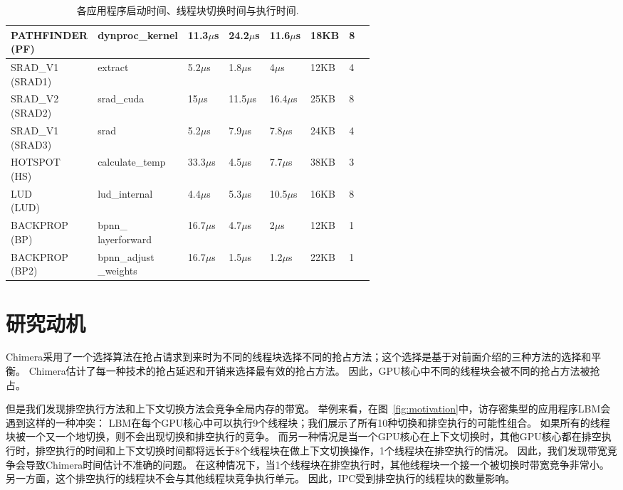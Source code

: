 \begin{scriptsize}
\begin{table}[t]
\begin{tabular}{|l|l|l|l|l|l|l|l|}
    \hline
    \tabincell{c}{PATHFINDER\\(PF)}  & dynproc\_kernel&11.3$\mu$s &24.2$\mu$s&11.6$\mu$s&18KB&8\\
    \hline
    \tabincell{c}{SRAD\_V1\\(SRAD1)} & extract&5.2$\mu$s &1.8$\mu$s&4$\mu$s&12KB&4\\
   	\hline
    \tabincell{c}{SRAD\_V2\\(SRAD2)}  & srad\_cuda& 15$\mu$s & 11.5$\mu$s&16.4$\mu$s&25KB&8\\
    \hline
    \tabincell{c}{SRAD\_V1\\(SRAD3)} & srad & 5.2$\mu$s &7.9$\mu$s &7.8$\mu$s&24KB&4\\
    \hline
    \tabincell{c}{HOTSPOT\\(HS)} & calculate\_temp &33.3$\mu$s&4.5$\mu$s&7.7$\mu$s&38KB&3\\
    \hline
    \tabincell{c}{LUD\\(LUD)} & lud\_internal & 4.4$\mu$s &5.3$\mu$s&10.5$\mu$s&16KB&8\\
    \hline
    \tabincell{c}{BACKPROP\\(BP)} & \tabincell{c}{bpnn\_ \\ layerforward} & 16.7$\mu$s &4.7$\mu$s &2$\mu$s&12KB&1\\
    \hline
    \tabincell{c}{BACKPROP\\(BP2)} & \tabincell{c}{bpnn\_adjust \\ \_weights} & 16.7$\mu$s & 1.5$\mu$s &1.2$\mu$s&22KB&1\\
    \hline
    
  \end{tabular}
  \caption{各应用程序启动时间、线程块切换时间与执行时间.}
  \label{table:time}
\end{table}
\end{scriptsize}

\section{研究动机}
Chimera采用了一个选择算法在抢占请求到来时为不同的线程块选择不同的抢占方法；这个选择是基于对前面介绍的三种方法的选择和平衡。
Chimera估计了每一种技术的抢占延迟和开销来选择最有效的抢占方法。
因此，GPU核心中不同的线程块会被不同的抢占方法被抢占。

但是我们发现排空执行方法和上下文切换方法会竞争全局内存的带宽。
举例来看，在图~\ref{fig:motivation}中，访存密集型的应用程序LBM会遇到这样的一种冲突：
LBM在每个GPU核心中可以执行9个线程块；我们展示了所有10种切换和排空执行的可能性组合。
如果所有的线程块被一个又一个地切换，则不会出现切换和排空执行的竞争。
而另一种情况是当一个GPU核心在上下文切换时，其他GPU核心都在排空执行时，排空执行的时间和上下文切换时间都将远长于8个线程块在做上下文切换操作，1个线程块在排空执行的情况。
因此，我们发现带宽竞争会导致Chimera时间估计不准确的问题。
在这种情况下，当1个线程块在排空执行时，其他线程块一个接一个被切换时带宽竞争非常小。
另一方面，这个排空执行的线程块不会与其他线程块竞争执行单元。
因此，IPC受到排空执行的线程块的数量影响。


